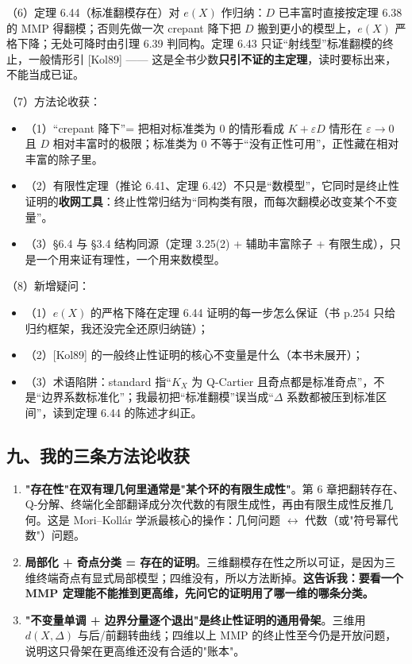 （6）定理 6.44（标准翻模存在）对 $e(X)$ 作归纳：$D$ 已丰富时直接按定理 6.38 的 MMP 得翻模；否则先做一次 crepant 降下把 $D$ 搬到更小的模型上，$e(X)$ 严格下降；无处可降时由引理 6.39 判同构。定理 6.43 只证“射线型”标准翻模的终止，一般情形引 [Kol89] —— 这是全书少数\textbf{只引不证的主定理}，读时要标出来，不能当成已证。

（7）方法论收获：
\begin{itemize}
\item （1）“crepant 降下”= 把相对标准类为 0 的情形看成 $K+\varepsilon D$ 情形在 $\varepsilon\to0$ 且 $D$ 相对丰富时的极限；标准类为 0 不等于“没有正性可用”，正性藏在相对丰富的除子里。
\item （2）有限性定理（推论 6.41、定理 6.42）不只是“数模型”，它同时是终止性证明的\textbf{收网工具}：终止性常归结为“同构类有限，而每次翻模必改变某个不变量”。
\item （3）\S6.4 与 \S3.4 结构同源（定理 3.25(2) + 辅助丰富除子 + 有限生成），只是一个用来证有理性，一个用来数模型。
\end{itemize}

（8）新增疑问：
\begin{itemize}
\item （1）$e(X)$ 的严格下降在定理 6.44 证明的每一步怎么保证（书 p.254 只给归约框架，我还没完全还原归纳链）；
\item （2）[Kol89] 的一般终止性证明的核心不变量是什么（本书未展开）；
\item （3）术语陷阱：standard 指“$K_X$ 为 Q-Cartier 且奇点都是标准奇点”，不是“边界系数标准化”；我最初把“标准翻模”误当成“$\Delta$ 系数都被压到标准区间”，读到定理 6.44 的陈述才纠正。
\end{itemize}

\subsection*{九、我的三条方法论收获}

\begin{enumerate}
\item \textbf{"存在性"在双有理几何里通常是"某个环的有限生成性"}。第 6 章把翻转存在、Q-分解、终端化全部翻译成分次代数的有限生成性，再由有限生成性反推几何。这是 Mori--Kollár 学派最核心的操作：几何问题 $\leftrightarrow$ 代数（或"符号幂代数"）问题。
\item \textbf{局部化 + 奇点分类 = 存在的证明}。三维翻模存在性之所以可证，是因为三维终端奇点有显式局部模型；四维没有，所以方法断掉。\textbf{这告诉我：要看一个 MMP 定理能不能推到更高维，先问它的证明用了哪一维的哪条分类。}
\item \textbf{"不变量单调 + 边界分量逐个退出"是终止性证明的通用骨架}。三维用 $d(X,\Delta)$ 与后/前翻转曲线；四维以上 MMP 的终止性至今仍是开放问题，说明这只骨架在更高维还没有合适的"账本"。
\end{enumerate}

